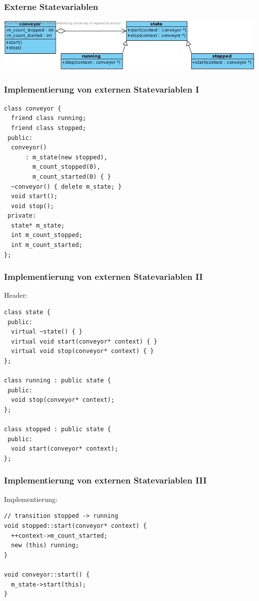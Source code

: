 \documentclass{beamer}
\begin{document}
\begin{frame}
 \frametitle{Externe Statevariablen}
 \includegraphics[scale=.44]{img/fsm_externe_state_var.jpg}
\end{frame}

\begin{frame}[fragile]
 \frametitle{Implementierung von externen Statevariablen I}
 \begin{lstlisting}
class conveyor {
  friend class running;
  friend class stopped;
 public:
  conveyor()
      : m_state(new stopped),
        m_count_stopped(0),
        m_count_started(0) { }
  ~conveyor() { delete m_state; }
  void start();
  void stop();
 private:
  state* m_state;
  int m_count_stopped;
  int m_count_started;
};
\end{lstlisting}
\end{frame}

\begin{frame}[fragile]
 \frametitle{Implementierung von externen Statevariablen II}
 Header:
 \begin{lstlisting}
class state {
 public:
  virtual ~state() { }
  virtual void start(conveyor* context) { }
  virtual void stop(conveyor* context) { }
};

class running : public state {
 public:
  void stop(conveyor* context);
};

class stopped : public state {
 public:
  void start(conveyor* context);
};
 \end{lstlisting}
\end{frame}

\begin{frame}[fragile]
 \frametitle{Implementierung von externen Statevariablen III}
 Implementierung:
 \begin{lstlisting}
// transition stopped -> running
void stopped::start(conveyor* context) {
  ++context->m_count_started;
  new (this) running;
}

void conveyor::start() {
  m_state->start(this);
}
 \end{lstlisting}
\end{frame}
\end{document}
